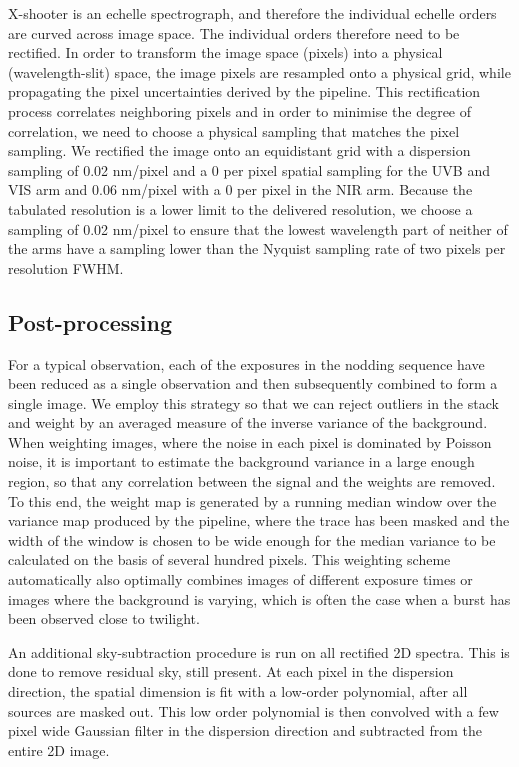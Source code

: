 \documentclass[longauth]{aa}    %
\begin{document}
X-shooter is an echelle spectrograph, and therefore the individual echelle
orders are curved across image space. The individual orders therefore need to be
rectified. In order to transform the image space (pixels) into a physical
(wavelength-slit) space, the image pixels are resampled onto a physical grid,
while propagating the pixel uncertainties derived by the pipeline. This
rectification  process correlates neighboring pixels and in order to minimise
the degree of correlation, we need to choose a physical sampling that matches
the pixel sampling. We rectified the image onto an equidistant grid with a
dispersion sampling of 0.02 nm/pixel and a 0 per pixel spatial sampling
for the UVB and VIS arm and 0.06 nm/pixel with a 0 per pixel in the NIR
arm.  Because the tabulated resolution is a lower limit to the delivered
resolution, we choose a sampling of 0.02 nm/pixel to ensure that the lowest
wavelength part of neither of the arms have a sampling lower than the Nyquist
sampling rate of two pixels per resolution FWHM.

\subsection{Post-processing} \label{postproc}

For a typical observation, each of the exposures in the nodding sequence have
been reduced as a single observation and then subsequently combined to form a
single image. We employ this strategy so that we can reject outliers in the
stack and weight by an averaged measure of the inverse variance of the
background. When weighting images, where the noise in each pixel is dominated by
Poisson noise, it is important to estimate the background variance in a large
enough region, so that any correlation between the signal and the weights are
removed. To this end, the weight map is generated by a running median window
over the variance map produced by the pipeline, where the trace has been masked
and the width of the window is chosen to be wide enough for the median variance to
be calculated on the basis of several hundred pixels. This weighting scheme
automatically also optimally combines images of different exposure times or
images where the background is varying, which is often the case when a burst has
been observed close to twilight.

An additional sky-subtraction procedure is run on all rectified 2D spectra.
This is done to remove residual sky, still present. At each pixel in the
dispersion direction, the spatial dimension is fit with a low-order polynomial,
after all sources are masked out. This low order polynomial is then convolved
with a few pixel wide Gaussian filter in the dispersion direction and subtracted
from the entire 2D image.
\end{document}
